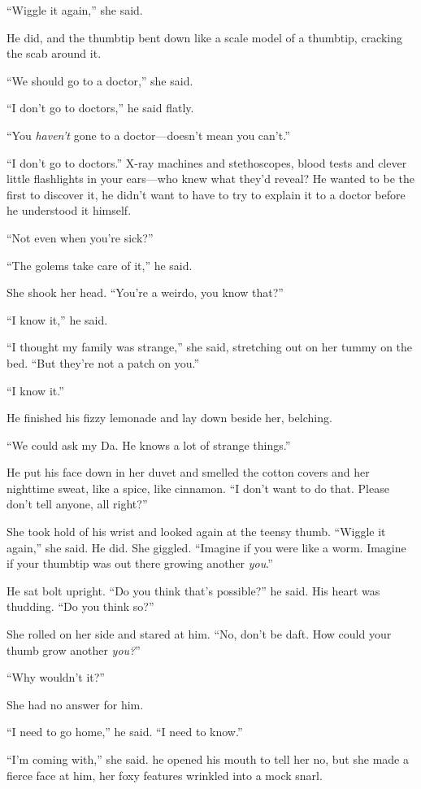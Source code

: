 ``Wiggle it again,'' she said.

He did, and the thumbtip bent down like a scale model of a thumbtip,
cracking the scab around it.

``We should go to a doctor,'' she said.

``I don't go to doctors,'' he said flatly.

``You \textit{haven't} gone to a doctor---doesn't mean you can't.''

``I don't go to doctors.'' X-ray machines and stethoscopes, blood
tests and clever little flashlights in your ears---who knew what
they'd reveal?  He wanted to be the first to discover it, he didn't
want to have to try to explain it to a doctor before he understood it
himself.

``Not even when you're sick?''

``The golems take care of it,'' he said.

She shook her head.  ``You're a weirdo, you know that?''

``I know it,'' he said.

``I thought my family was strange,'' she said, stretching out on her
tummy on the bed.  ``But they're not a patch on you.''

``I know it.''

He finished his fizzy lemonade and lay down beside her, belching.

``We could ask my Da.  He knows a lot of strange things.''

He put his face down in her duvet and smelled the cotton covers and
her nighttime sweat, like a spice, like cinnamon.  ``I don't want to
do that.  Please don't tell anyone, all right?''

She took hold of his wrist and looked again at the teensy thumb. 
``Wiggle it again,'' she said.  He did.  She giggled.  ``Imagine if
you were like a worm.  Imagine if your thumbtip was out there growing
another \textit{you}.''

He sat bolt upright.  ``Do you think that's possible?'' he said.  His
heart was thudding.  ``Do you think so?''

She rolled on her side and stared at him.  ``No, don't be daft.  How
could your thumb grow another \textit{you?}''

``Why wouldn't it?''

She had no answer for him.

``I need to go home,'' he said.  ``I need to know.''

``I'm coming with,'' she said.  he opened his mouth to tell her no,
but she made a fierce face at him, her foxy features wrinkled into a
mock snarl.

